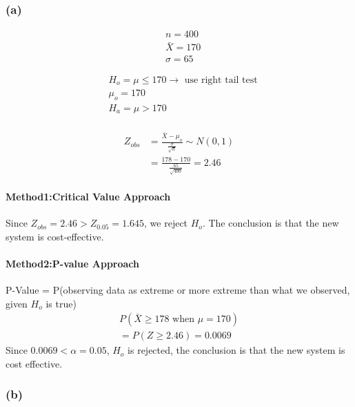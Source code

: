 \documentclass{article}
\begin{document}
        \subsubsection*{(a)}
        \begin{align*}
            &n = 400\\
            &\bar{X} = 170\\
            &\sigma = 65
        \end{align*}

        \begin{align*}
            &H_{o} = \mu \leq 170  \rightarrow \text{ use right tail test}\\
            &\mu_{o} = 170\\
            &H_{a} = \mu > 170\\
        \end{align*}

        \begin{align*}
            Z_{obs} &= \frac{\bar{X}-\mu_{o}}{\frac{\sigma}{\sqrt{n}}} \sim N(0,1)\\
            &= \frac{178-170}{\frac{65}{\sqrt{400}}} = 2.46
        \end{align*}
        \paragraph*{Method1:Critical Value Approach}
        Since $Z_{obs}= 2.46 > Z_{0.05} = 1.645$, we reject $H_{o}$. The conclusion is that 
        the new system is cost-effective.\par
        
        \paragraph*{Method2:P-value Approach}
        P-Value = P(observing data as extreme or more extreme than what we observed, given $H_{o}$ is true)
        \begin{align*}
            P(\bar{X} \geq 178 \text{ when } \mu =  170)\\
            = P(Z \geq 2.46) = 0.0069
        \end{align*}
        Since $0.0069 < \alpha = 0.05$, $H_{o}$ is rejected, the conclusion is that the new system is cost 
        effective.

        \subsubsection*{(b)}
\end{document}
